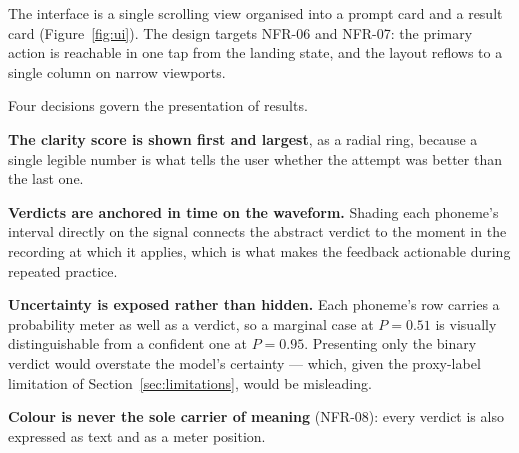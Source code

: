 The interface is a single scrolling view organised into a prompt card and a
result card (Figure~\ref{fig:ui}). The design targets NFR-06 and NFR-07: the
primary action is reachable in one tap from the landing state, and the layout
reflows to a single column on narrow viewports.

Four decisions govern the presentation of results.

\textbf{The clarity score is shown first and largest}, as a radial ring, because
a single legible number is what tells the user whether the attempt was better
than the last one.

\textbf{Verdicts are anchored in time on the waveform.} Shading each phoneme's
interval directly on the signal connects the abstract verdict to the moment in
the recording at which it applies, which is what makes the feedback actionable
during repeated practice.

\textbf{Uncertainty is exposed rather than hidden.} Each phoneme's row carries a
probability meter as well as a verdict, so a marginal case at $P = 0.51$ is
visually distinguishable from a confident one at $P = 0.95$. Presenting only the
binary verdict would overstate the model's certainty --- which, given the
proxy-label limitation of Section~\ref{sec:limitations}, would be misleading.

\textbf{Colour is never the sole carrier of meaning} (NFR-08): every verdict is
also expressed as text and as a meter position.

